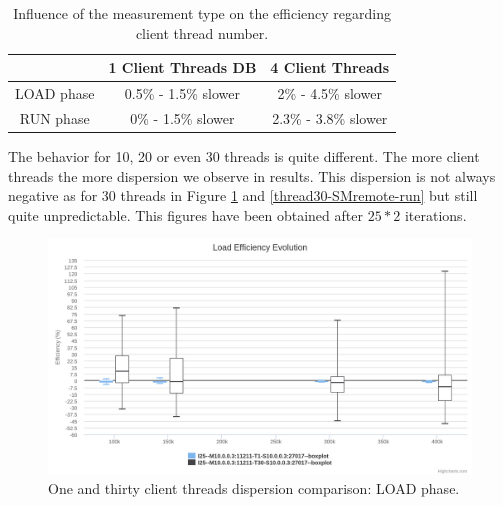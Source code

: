 \documentclass[a4paper,11pt]{report}
\begin{document}
\begin{table}[ht]
\begin{center}
	\begin{tabular}{|c|c|c|}
		\hline
		  & 1 Client Threads DB & 4 Client Threads \\
		\hline
	   	LOAD phase & 0.5\% - 1.5\% slower & 2\% - 4.5\% slower \\
	   	RUN phase & 0\% - 1.5\% slower & 2.3\% - 3.8\% slower \\
	    \hline
	\end{tabular}
	\caption{Influence of the measurement type on the efficiency regarding client thread number.}
\label{thread-table}
\end{center}
\end{table}

The behavior for 10, 20 or even 30 threads is quite different. The more client threads the more dispersion we observe in results. This dispersion is not always negative as for 30 threads in Figure \ref{thread30-SMremote-load} and \ref{thread30-SMremote-run} but still quite unpredictable. This figures have been obtained after $25*2$ iterations.

\begin{figure}[ht]
\begin{center}
\includegraphics[width=1\linewidth]{images/evaluation/thread30-SMremote-load.png}
\caption{One and thirty client threads dispersion comparison: LOAD phase.}
\label{thread30-SMremote-load}
\end{center}
\end{figure}
\end{document}
